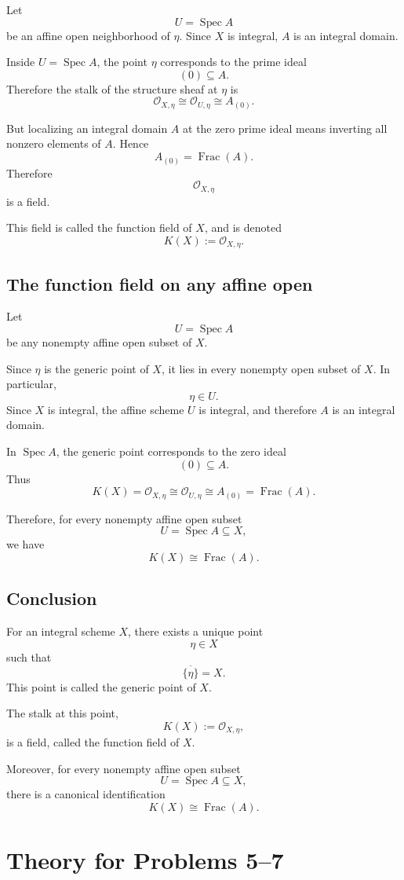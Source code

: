 \documentclass[12pt,a4paper]{article}
\DeclareMathOperator{\Spec}{Spec}
\newcommand{\OO}{\mathcal{O}}
\newcommand{\Frac}{\operatorname{Frac}}
\providecommand{\Spec}{\operatorname{Spec}}
\theoremstyle{notespace}
\begin{document}
Let
\[
U=\Spec A
\]
be an affine open neighborhood of \(\eta\). Since \(X\) is integral, \(A\) is an integral domain.

Inside \(U=\Spec A\), the point \(\eta\) corresponds to the prime ideal
\[
(0)\subseteq A.
\]
Therefore the stalk of the structure sheaf at \(\eta\) is
\[
\OO_{X,\eta}
\cong
\OO_{U,\eta}
\cong
A_{(0)}.
\]

But localizing an integral domain \(A\) at the zero prime ideal means inverting all nonzero elements of \(A\). Hence
\[
A_{(0)}=\Frac(A).
\]
Therefore
\[
\OO_{X,\eta}
\]
is a field.

This field is called the function field of \(X\), and is denoted
\[
K(X):=\OO_{X,\eta}.
\]

\subsection*{The function field on any affine open}

Let
\[
U=\Spec A
\]
be any nonempty affine open subset of \(X\).

Since \(\eta\) is the generic point of \(X\), it lies in every nonempty open subset of \(X\). In particular,
\[
\eta\in U.
\]
Since \(X\) is integral, the affine scheme \(U\) is integral, and therefore \(A\) is an integral domain.

In \(\Spec A\), the generic point corresponds to the zero ideal
\[
(0)\subseteq A.
\]
Thus
\[
K(X)
=
\OO_{X,\eta}
\cong
\OO_{U,\eta}
\cong
A_{(0)}
=
\Frac(A).
\]

Therefore, for every nonempty affine open subset
\[
U=\Spec A\subseteq X,
\]
we have
\[
K(X)\cong \Frac(A).
\]

\subsection*{Conclusion}

For an integral scheme \(X\), there exists a unique point
\[
\eta\in X
\]
such that
\[
\overline{\{\eta\}}=X.
\]
This point is called the generic point of \(X\).

The stalk at this point,
\[
K(X):=\OO_{X,\eta},
\]
is a field, called the function field of \(X\).

Moreover, for every nonempty affine open subset
\[
U=\Spec A\subseteq X,
\]
there is a canonical identification
\[
K(X)\cong \Frac(A).
\]

\section{Theory for Problems 5--7}
\end{document}

